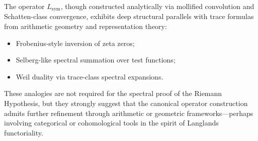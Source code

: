 The operator \( L_{\mathrm{sym}} \), though constructed analytically via mollified convolution and Schatten-class convergence, exhibits deep structural parallels with trace formulas from arithmetic geometry and representation theory:
\begin{itemize}
  \item Frobenius-style inversion of zeta zeros;
  \item Selberg-like spectral summation over test functions;
  \item Weil duality via trace-class spectral expansions.
\end{itemize}

These analogies are not required for the spectral proof of the Riemann Hypothesis, but they strongly suggest that the canonical operator construction admits further refinement through arithmetic or geometric frameworks—perhaps involving categorical or cohomological tools in the spirit of Langlands functoriality.
